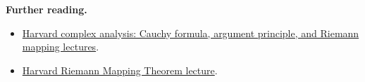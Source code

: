 \documentclass[preprint,12pt,aps,pra,showkeys,amsmath,amssymb,superscriptaddress,floatfix]{revtex4-2}
\theoremstyle{definition}
\theoremstyle{remark}
\begin{document}
\par\smallskip\begingroup\footnotesize\linespread{1.0}\selectfont\noindent\textbf{Further reading.} \begin{itemize}
\item
  \href{https://people.math.harvard.edu/~siu/math113/}{Harvard complex
  analysis: Cauchy formula, argument principle, and Riemann mapping
  lectures}.
\item
  \href{https://people.math.harvard.edu/~siu/math113/15_riemann_mapping_theorem.pdf}{Harvard
  Riemann Mapping Theorem lecture}.
\end{itemize}\par\endgroup
\end{document}
